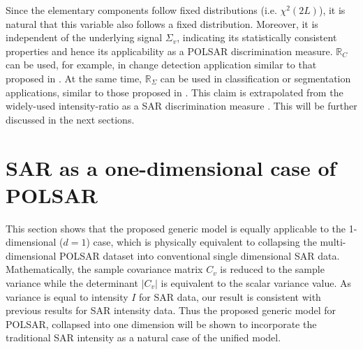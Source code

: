 \documentclass[journal]{IEEEtran}
\begin{document}

Since the elementary components follow fixed distributions (i.e. $\chi^2(2L)$),
  it is natural that this variable also follows a fixed distribution.
Moreover, it is independent of the underlying signal $\Sigma_v$,
  indicating its statistically consistent properties and hence its applicability as a POLSAR discrimination measure.
$\mathbb{R}_C$ can be used, for example, in change detection application similar to that proposed in \cite{Conradsen_2003_TGRS_4}.
At the same time, $\mathbb{R}_{\Sigma}$ can be used in classification or segmentation applications, similar to those proposed in \cite{Kersten_2005_TGRS_519, Lee_2011_IGARSS_3740, Cao_2007_TGRS_3454}.
This claim is extrapolated from the widely-used intensity-ratio as a SAR discrimination measure \cite{Rignot_1993_TGRS_896}.
This will be further discussed in the next sections.

\section{SAR as a one-dimensional case of POLSAR}
\label{sec:sar_special_case_of_polsar}

This section shows that the proposed generic model is equally  applicable to the 1-dimensional ($d=1$) case,
  which is physically equivalent to  collapsing the multi-dimensional POLSAR dataset  into conventional single dimensional SAR data.
Mathematically, the sample covariance matrix $C_v$ is reduced to the sample variance while the determinant $|C_v|$ is equivalent to  the scalar variance value.
As variance is equal to intensity $I$ for SAR data, our result is consistent with previous results for SAR intensity data.
Thus the proposed generic model for POLSAR, collapsed into one dimension will be shown to incorporate the traditional SAR intensity as a natural case of the unified model.
  
\end{document}
